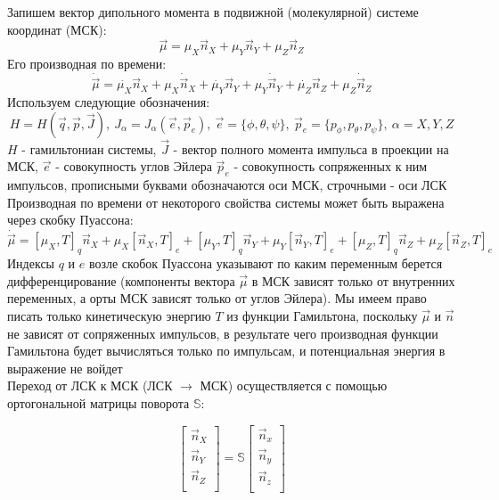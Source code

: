 
Запишем вектор дипольного момента в подвижной (молекулярной) системе координат (МСК):
\[
\vec{\mu} = \mu_X\vec{n}_X + \mu_Y\vec{n}_Y + \mu_Z\vec{n}_Z
\]
Его производная по времени: 
\begin{equation}
\label{eq:mu_dot}
\dot{\vec{\mu}} = \dot{\mu_X}\vec{n}_X + \mu_X\dot{\vec{n}}_X +
\dot{\mu_Y}\vec{n}_Y + \mu_Y\dot{\vec{n}}_Y +
\dot{\mu_Z}\vec{n}_Z + \mu_Z\dot{\vec{n}}_Z
\end{equation}
Используем следующие обозначения:
\[
H = H(\vec{q},\vec{p},\vec{J}),\: J_{\alpha} = J_{\alpha}(\vec{e},\vec{p}_e), \: \vec{e} = \{\phi,\theta,\psi \},\: \vec{p}_e = \{p_{\phi}, p_{\theta}, p_{\psi}  \}, \: \alpha = X, Y, Z
\]
$H$ - гамильтониан системы, 
$\vec J$ -  вектор полного момента импульса в проекции на МСК,
$\vec e$ - совокупность углов Эйлера
$\vec p_e$ - совокупность сопряженных к ним импульсов,
прописными буквами обозначаются оси МСК, строчными - оси ЛСК\\

Производная по времени от некоторого свойства системы может быть выражена через скобку Пуассона:
\[
\dot{\vec{\mu}} = [\mu_X,T]_q\vec{n}_X + \mu_X[\vec{n}_X,T]_e +
[\mu_Y,T]_q\vec{n}_Y + \mu_Y[\vec{n}_Y,T]_e +
[\mu_Z,T]_q\vec{n}_Z + \mu_Z[\vec{n}_Z,T]_e
\]
Индексы $q$ и $e$ возле скобок Пуассона указывают по каким переменным берется дифференцирование (компоненты вектора $\vec\mu$ в МСК зависят только от внутренних переменных, а орты МСК зависят только от углов Эйлера). Мы имеем право писать только кинетическую энергию $T$ из функции Гамильтона, поскольку $\vec\mu$ и $\vec n$ не зависят от сопряженных импульсов, в результате чего производная функции Гамильтона будет вычисляться только по импульсам, и потенциальная энергия в выражение не войдет  \\

Переход от ЛСК к МСК
(ЛСК $\rightarrow$ МСК) осуществляется с помощью ортогональной матрицы поворота $\mathbb{S}$:

\begin{equation}
\left[\begin{matrix}
\vec{n}_X \\
\vec{n}_Y \\
\vec{n}_Z \\
\end{matrix} \right] = \mathbb{S}
 \left[\begin{matrix}
\vec{n}_x \\
\vec{n}_y \\
\vec{n}_z \\
\end{matrix} \right]
\end{equation}


